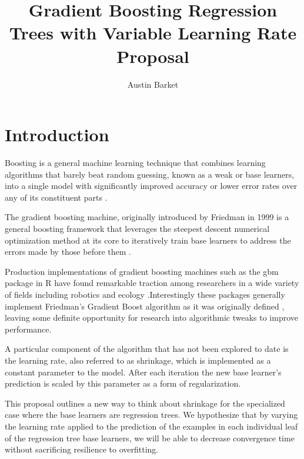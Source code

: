 \documentclass[runningheads]{llncs}
\begin{document}
\pagestyle{headings}

\title{Gradient Boosting Regression Trees with Variable Learning Rate Proposal}
\titlerunning{}
\author{Austin Barket}
 \maketitle

\section{Introduction}

Boosting is a general machine learning technique that combines learning algorithms that barely beat random guessing, known as a weak or base learners, into a single model with significantly improved accuracy or lower error rates over any of its constituent parts \cite{StrengthOfWeak}  \cite{BoostingSurvey}. 

The gradient boosting machine, originally introduced by Friedman in 1999 is a general boosting framework that leverages the steepest descent numerical optimization method at its core to iteratively train base learners to address the errors made by those before them \cite{2001Friedman}.

Production implementations of gradient boosting machines such as the gbm package in R have found remarkable traction among researchers in a wide variety of fields including robotics and ecology \cite{GBMTut} \cite{ecological} .Interestingly these packages generally implement Friedman's Gradient Boost algorithm as it was originally defined \cite{2012ridgeway}, leaving some definite opportunity for research into algorithmic tweaks to improve performance. 

A particular component of the algorithm that has not been explored to date is the learning rate, also referred to as shrinkage, which is implemented as a constant parameter to the model. After each iteration the new base learner's prediction is scaled by this parameter as a form of regularization. 

This proposal outlines a new way to think about shrinkage for the specialized case where the base learners are regression trees. We hypothesize that by varying the learning rate applied to the prediction of the examples in each individual leaf of the regression tree base learners, we will be able to decrease convergence time without sacrificing resilience to overfitting. 
\end{document}
